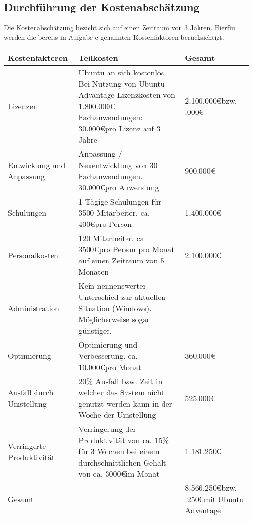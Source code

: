 \documentclass[12pt,utf8]{scrartcl}
\begin{document}
\subsection*{Durchführung der Kostenabschätzung}

Die Kostenabschätzung bezieht sich auf einen Zeitraum von 3 Jahren. Hierfür werden die bereits in Aufgabe c genannten Kostenfaktoren berücksichtigt.

\begin{table}[h]
\begin{tabular}{|p{5cm}|p{8cm}|p{2cm}|}
\hline
Kostenfaktoren & Teilkosten & Gesamt \\
\hline
Lizenzen & Ubuntu an sich kostenlos. Bei Nutzung von Ubuntu Advantage Lizenzkosten von 1.800.000\euro . \newline 70 Fachanwendungen: 30.000\euro \space pro Lizenz auf 3 Jahre & 2.100.000\euro \newline bzw. \newline 3.900.000\euro \\
\hline
Entwicklung und Anpassung & Anpassung / Neuentwicklung von 30 Fachanwendungen. 30.000\euro \space pro Anwendung & 900.000\euro \\
\hline
Schulungen & 1-Tägige Schulungen für 3500 Mitarbeiter. ca. 400\euro \space pro Person & 1.400.000\euro \\
\hline
Personalkosten & 120 Mitarbeiter. ca. 3500\euro \space pro Person pro Monat auf einen Zeitraum von 5 Monaten & 2.100.000\euro \\
\hline
Administration & Kein nennenswerter Unterschied zur aktuellen Situation (Windows). Möglicherweise sogar günstiger. & \\
\hline
Optimierung & Optimierung und Verbesserung. ca. 10.000\euro pro Monat & 360.000\euro \\
\hline
Ausfall durch Umstellung & 20\% Ausfall bzw. Zeit in welcher das System nicht genutzt werden kann in der Woche der Umstellung & 525.000\euro \\
\hline
Verringerte Produktivität & Verringerung der Produktivität von ca. 15\% für 3 Wochen bei einem durchschnittlichen Gehalt von ca. 3000\euro \space im Monat & 1.181.250\euro \\
\hline
Gesamt & & 8.566.250\euro \newline bzw. \newline 10.366.250\euro \space mit Ubuntu Advantage \\
\hline
\end{tabular}
\end{table}
\end{document}
